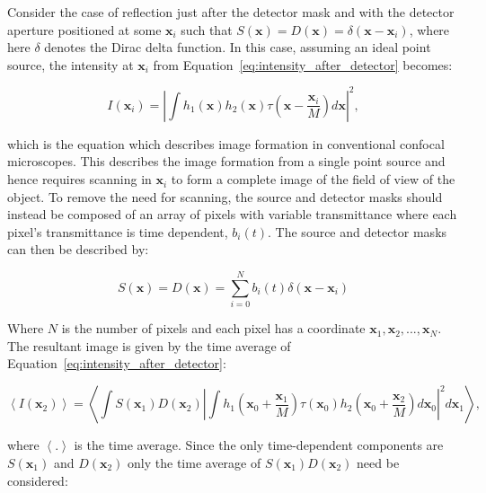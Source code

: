 Consider the case of reflection just after the detector mask 
and with the detector aperture positioned at some 
$\textbf{x}_{i}$ such that $S\left(\textbf{x}\right) = 
D\left(\textbf{x}\right) = \delta\left(\textbf{x} - 
\textbf{x}_{i}\right)$, where here $\delta$ denotes the Dirac 
delta function. In this case, assuming an ideal point source, 
the intensity at $\textbf{x}_{i}$ from 
Equation~\ref{eq:intensity_after_detector} becomes:

\begin{equation}\label{eq:confocal_image_form}
I\left(\textbf{x}_{i}\right) = \left| \int h_{1}\left(\textbf{x}\right) h_{2}\left(\textbf{x}\right) \tau\left(\textbf{x} - \frac{\textbf{x}_{i}}{M}\right)d\textbf{x}\right|^{2},
\end{equation}

which is the equation which describes image formation in 
conventional confocal microscopes\cite{wilson1990confocal}.
This describes the image formation from a single point source 
and hence requires scanning in $\textbf{x}_{i}$ to form a 
complete image of the field of view of the object. To remove 
the need for scanning, the source and detector masks should 
instead be composed of an array of pixels with variable 
transmittance where each pixel's transmittance is time 
dependent, $b_{i}\left(t\right)$. The source and detector 
masks can then be described by:

\begin{equation}\label{eq:detector_aperture_time}
S\left(\textbf{x}\right) = D\left(\textbf{x}\right) = \sum_{i=0}^{N} b_{i}\left(t\right)\delta\left(\textbf{x} - \textbf{x}_{i}\right)
\end{equation}

Where $N$ is the number of pixels and each pixel has a 
coordinate $\textbf{x}_{1}, \textbf{x}_{2},...,\textbf{x}_{N}$. 
The resultant image is given by the time average of 
Equation~\ref{eq:intensity_after_detector}:

\begin{equation}\label{eq:confocal_image_time_ave}
\left\langle I\left(\textbf{x}_{2}\right)\right\rangle = \left\langle \int S\left(\textbf{x}_{1}\right) D\left(\textbf{x}_{2}\right) \left| \int h_{1}\left(\textbf{x}_{0} + \frac{\textbf{x}_{1}}{M}\right) \tau\left(\textbf{x}_{0}\right) h_{2}\left(\textbf{x}_{0} + \frac{\textbf{x}_{2}}{M}\right)d\textbf{x}_{0}\right|^{2}d\textbf{x}_{1}\right\rangle,
\end{equation}

where $\left\langle . \right\rangle$ is the time average. 
Since the only time-dependent components are 
$S\left(\textbf{x}_{1}\right)$ and $D\left(\textbf{x}_{2}\right)$ 
only the time average of 
$S\left(\textbf{x}_{1}\right) D\left(\textbf{x}_{2}\right)$ 
need be considered:

